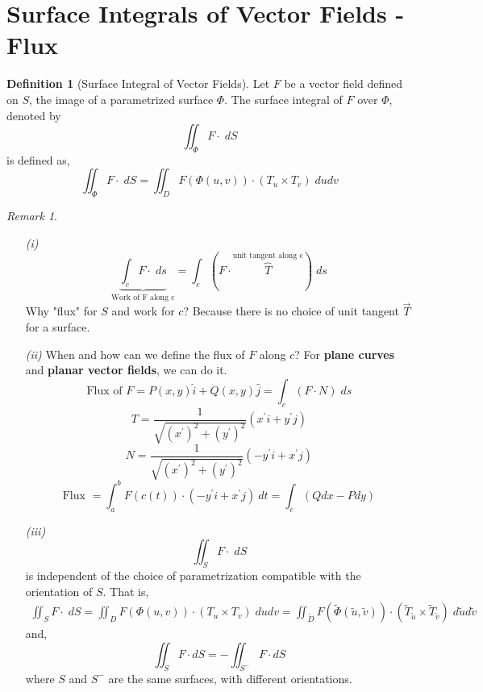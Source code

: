 \documentclass[12pt]{book}
\theoremstyle{definition}
\newtheorem{definition}{Definition}[section]
\theoremstyle{remark}
\newtheorem*{remark}{Remark}
\begin{document}
\section{Surface Integrals of Vector Fields - Flux}
\begin{definition}[Surface Integral of Vector Fields]
Let $F$ be a vector field defined on $S$, the image of a parametrized surface $\Phi$. The surface integral of $F$ over $\Phi$, denoted by
  $$\iint_{\Phi} F \cdot \; dS$$
  is defined as,
  $$\iint_{\Phi} F \cdot \; dS = \iint_D F(\Phi (u,v)) \cdot (T_u \times T_v)\;du dv $$
\end{definition}
\begin{remark} 
  $  $ \newline
  \begin{enumerate}
    \item[\it (i)] $$\underbrace{\int_c F \cdot \; ds}_{\text{Work of F along c}} = \int_c (F \cdot \overbrace{T}^{\text{unit tangent along c}}) \; ds$$
    Why "flux" for $S$ and work for $c$? Because there is no choice of unit tangent $\vec T$ for a surface. 
    \item[\it (ii)] When and how can we define the flux of $F$ along $c$? For \textbf{plane curves} and \textbf{planar vector fields}, we can do it. 
    $$\text{Flux of }F = P(x, y)\hat i + Q(x,y) \hat j = \int_c (F \cdot  N) \; ds $$
    $$T = \frac{1}{\sqrt{(x^\prime)^2 + (y^\prime )^2}} ( x^\prime i + y^\prime j )  $$
$$N = \frac{1}{\sqrt{(x^\prime)^2 + (y^\prime )^2}} ( -y^\prime i + x^\prime j )  $$
    $$\text{Flux } = \int_{{a}}^{{b}} F(c(t)) \cdot ( -y^\prime i + x^\prime j ) \: d{t} = \int_c (Qdx - P dy)  $$
    \item[\it (iii)] $$\iint_S F \cdot \; dS $$
    is independent of the choice of parametrization compatible with the orientation of $S$. That is, 
    \begin{equation*}
      \begin{split}
        \iint_S F \cdot \; dS = \iint_D F(\Phi (u,v))\cdot ( T_u \times T_v ) \;du dv = \iint_{\tilde D} F(\tilde \Phi( \tilde u, \tilde v )) \cdot (\tilde T_{\tilde u}\times \tilde T_{\tilde v}) \; d \tilde u d\tilde v
      \end{split}
    \end{equation*}
    and,
    $$\iint_S F \cdot dS = -\iint_{S^-} F \cdot dS $$
    where $S$ and $S^-$ are the same surfaces, with different orientations. 
  \end{enumerate}
\end{remark}
\end{document}
